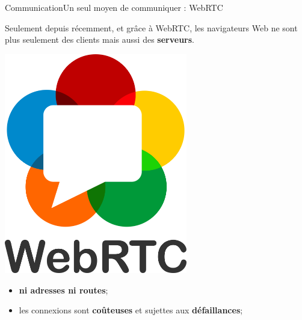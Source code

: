 \begin{frame}{Communication}{Un seul moyen de communiquer : WebRTC}


  \begin{minipage}{0.67\textwidth}
    Seulement depuis récemment, et grâce à WebRTC, les navigateurs Web ne sont
    plus seulement des clients mais aussi des \textbf{serveurs}.
  \end{minipage}
  \hfill
  \begin{minipage}{0.3\textwidth}
    \begin{center}
    \includegraphics[width=0.6\textwidth]{img/webrtc.png}
    \end{center}
  \end{minipage}
  
  \begin{itemize}
  \item \textbf{ni adresses ni routes};
  \item les connexions sont \textbf{coûteuses} et sujettes aux
    \textbf{défaillances};
  \end{itemize}
  
  \vspace{0.5cm}


\end{frame}
